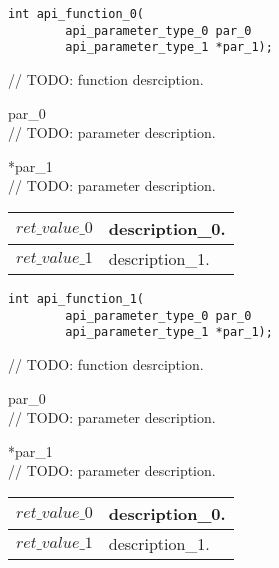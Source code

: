 
\begin{lstlisting}[language={[ANSI]C}, sensitive=true, tabsize=4,
	keywords={if, else, for, while, return, goto, typedef, struct, int, api_parameter_type_0, api_parameter_type_1},
	keywordstyle=\kwdsty]
int api_function_0(
        api_parameter_type_0 par_0
        api_parameter_type_1 *par_1);
\end{lstlisting}

\des
// TODO: function desrciption.

\parameters
\des
{} par\_0\\
// TODO: parameter description.

 *par\_1\\
// TODO: parameter description.

\ndes

\returns
\des
\begin{flushleft}
\begin{tabular}{|l|l|}
\hline
	$ret\_value\_0$	& description\_0.\\
\hline
	$ret\_value\_1$	& description\_1.\\
\hline
\end{tabular}
\end{flushleft}
\ndes

\ndes
\nfnc


\begin{lstlisting}[language={[ANSI]C}, sensitive=true, tabsize=4,
	keywords={if, else, for, while, return, goto, typedef, struct, int, api_parameter_type_0, api_parameter_type_1},
	keywordstyle=\kwdsty]
int api_function_1(
        api_parameter_type_0 par_0
        api_parameter_type_1 *par_1);
\end{lstlisting}

\des
// TODO: function desrciption.

\parameters
\des
{} par\_0\\
// TODO: parameter description.

 *par\_1\\
// TODO: parameter description.

\ndes

\returns
\des
\begin{flushleft}
\begin{tabular}{|l|l|}
\hline
	$ret\_value\_0$	& description\_0.\\
\hline
	$ret\_value\_1$	& description\_1.\\
\hline
\end{tabular}
\end{flushleft}
\ndes

\ndes
\nfnc

